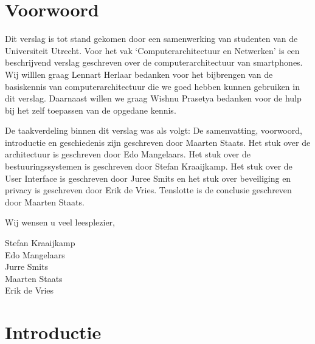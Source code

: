 \chapter{Voorwoord}

Dit verslag is tot stand gekomen door een samenwerking van studenten van de Universiteit Utrecht. Voor het vak ‘Computerarchitectuur en Netwerken’ is een beschrijvend verslag geschreven over de computerarchitectuur van smartphones. Wij willlen graag Lennart Herlaar bedanken voor het bijbrengen van de basiskennis van computerarchitectuur die we goed hebben kunnen gebruiken in dit verslag. Daarnaast willen we graag Wishnu Prasetya bedanken voor de hulp bij het zelf toepassen van de opgedane kennis.

De taakverdeling binnen dit verslag was als volgt: De samenvatting, voorwoord, introductie en geschiedenis zijn geschreven door Maarten Staats. Het stuk over de architectuur is geschreven door Edo Mangelaars. Het stuk over de bestuuringssystemen is geschreven door Stefan Kraaijkamp. Het stuk over de User Interface is geschreven door Juree Smits en het stuk over beveiliging en privacy is geschreven door Erik de Vries. Tenslotte is de conclusie geschreven door Maarten Staats.

Wij wensen u veel leesplezier,

Stefan Kraaijkamp\\
Edo Mangelaars\\
Jurre Smits\\
Maarten Staats\\
Erik de Vries\\

\chapter{Introductie}

